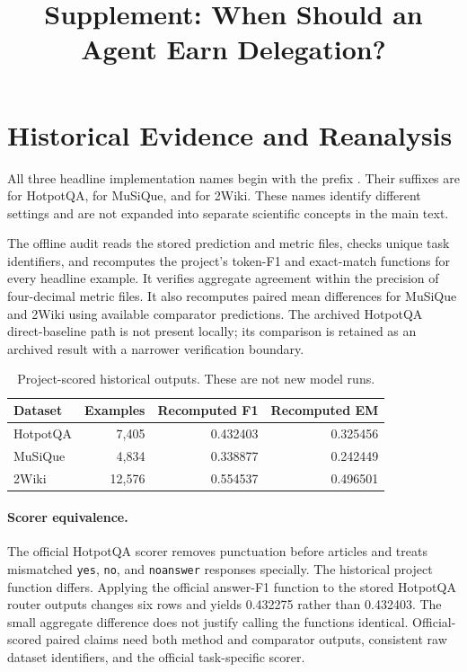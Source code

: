 \documentclass[sigconf,anonymous]{aamas}
\title{Supplement: When Should an Agent Earn Delegation?}
\begin{document}
\maketitle

\section{Historical Evidence and Reanalysis}

All three headline implementation names begin with the prefix . Their suffixes are  for HotpotQA,  for MuSiQue, and  for 2Wiki. These names identify different settings and are not expanded into separate scientific concepts in the main text.

The offline audit reads the stored prediction and metric files, checks unique task identifiers, and recomputes the project's token-F1 and exact-match functions for every headline example. It verifies aggregate agreement within the precision of four-decimal metric files. It also recomputes paired mean differences for MuSiQue and 2Wiki using available comparator predictions. The archived HotpotQA direct-baseline path is not present locally; its comparison is retained as an archived result with a narrower verification boundary.

\begin{table}[h]
\centering
\begin{tabular}{lrrr}
\toprule
Dataset & Examples & Recomputed F1 & Recomputed EM \\
\midrule
HotpotQA & 7,405 & 0.432403 & 0.325456 \\
MuSiQue & 4,834 & 0.338877 & 0.242449 \\
2Wiki & 12,576 & 0.554537 & 0.496501 \\
\bottomrule
\end{tabular}
\caption{Project-scored historical outputs. These are not new model runs.}
\end{table}

\paragraph{Scorer equivalence.}
The official HotpotQA scorer removes punctuation before articles and treats mismatched \texttt{yes}, \texttt{no}, and \texttt{noanswer} responses specially. The historical project function differs. Applying the official answer-F1 function to the stored HotpotQA router outputs changes six rows and yields 0.432275 rather than 0.432403. The small aggregate difference does not justify calling the functions identical. Official-scored paired claims need both method and comparator outputs, consistent raw dataset identifiers, and the official task-specific scorer.
\end{document}
